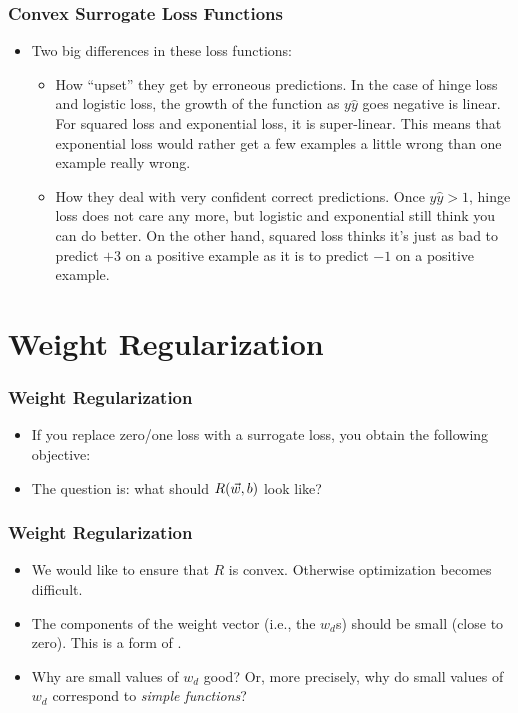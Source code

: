 \documentclass[trans,aspectratio=169]{beamer}
\begin{document}
\begin{frame}
  \frametitle{Convex Surrogate Loss Functions}
\begin{itemize}
\item
Two big differences in these loss functions:
\begin{itemize}
\item How ``upset'' they get by erroneous predictions.  In the
case of hinge loss and logistic loss, the growth of the function as
$y\hat y$ goes negative is linear.  For squared loss and exponential
loss, it is super-linear.  This means that exponential loss would
rather get a few examples a little wrong than one example really
wrong. 
\item How they deal with very confident
correct predictions.  Once $y\hat y>1$, hinge loss does not care any
more, but logistic and exponential still think you can do better.  On
the other hand, squared loss thinks it's just as bad to predict $+3$
on a positive example as it is to predict $-1$ on a positive example.
\end{itemize}
\end{itemize}
\end{frame}

\section{Weight Regularization}

\begin{frame}
  \frametitle{Weight Regularization}
\begin{itemize}
\item
If you replace  zero/one loss with a
surrogate loss, you obtain the following objective:
%
%
\item The question is: what should $R({\vec w},b)$ look like?
\end{itemize}
\end{frame}

\begin{frame}
  \frametitle{Weight Regularization}
\begin{itemize}
\item
We would like to
ensure that $R$ is convex.  Otherwise  optimization becomes difficult.
\item The components of the weight vector (i.e., the $w_d$s) should be
small (close to zero).  This is a form of .
\item 
Why are small values of $w_d$ good?  Or, more precisely, why do small
values of $w_d$ correspond to \emph{simple functions}? 
\end{itemize}
\end{frame}
\end{document}
